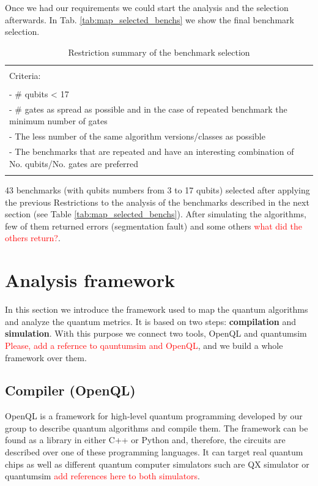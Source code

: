 Once we had our requirements we could start the analysis and the selection afterwards.
In Tab. \ref{tab:map_selected_benchs} we show the final benchmark selection.
\begin{table}[htbp]
\caption{\label{tab:org0f8ca31}
Restriction summary of the benchmark selection}
\centering
\begin{tabular}{|l|}
\hline
\\
Criteria:\\
\\
- \# qubits < 17\\
- \# gates as spread as possible and in the case of repeated benchmark the minimum number of gates\\
- The less number of the same algorithm versions/classes as possible\\
- The benchmarks that are repeated and have an interesting combination of No. qubits/No. gates are  preferred\\
\\
\hline
\end{tabular}
\end{table}
43 benchmarks (with qubits numbers from 3 to 17 qubits) selected after applying the previous Restrictions to the analysis of the benchmarks described in the next section (see Table \ref{tab:map_selected_benchs}).
After simulating the algorithms, few of them returned errors (segmentation fault) and some others \textcolor{red}{ what did the others return?}.

\section{Analysis framework}
\label{sec:orgc0c805b}
In this section we introduce the framework used to map the quantum algorithms and analyze the quantum metrics.
It is based on two steps: \textbf{compilation} and \textbf{simulation}.
With this purpose we connect two tools, OpenQL and quantumsim \textcolor{red}{Please, add a refernce to qauntumsim and OpenQL}, and we build a whole framework over them.

\subsection{Compiler (OpenQL)}
\label{sec:orgeebd0c8}
OpenQL is a framework for high-level quantum programming developed by our group to describe quantum algorithms and compile them.
The framework can be found as a library in either C++ or Python and, therefore, the circuits are described over one of these programming languages. It can target real quantum chips as well as different quantum computer simulators such are QX simulator or quantumsim \textcolor{red}{add references here to both simulators}. 

